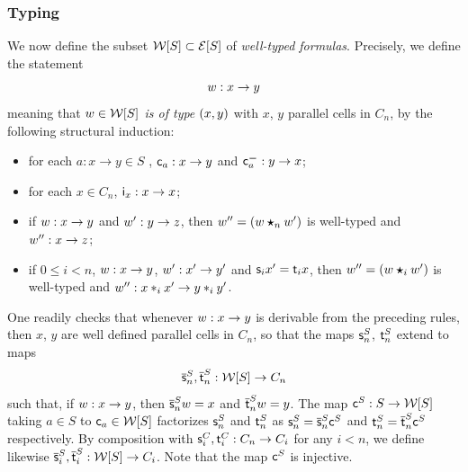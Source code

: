 \subsubsection{Typing}\label{ssubsec:types}
We now define the
subset  $\mathcal{W}[S]\subset\mathcal{E}[S]$ of {\em well-typed formulas}.
Precisely, we define the statement
\[w:x\to y\]
meaning that {\em $w\in\mathcal{W}[S]$ is of type $(x,y)$} with $x$, $y$ parallel
cells in $C_n$, by the following structural induction:
\begin{itemize}
\item for each $a:x\to y\in S$ ,
  $\mathsf{c}_{a}:x\to y$
  and $\mathsf{c}^{\boldsymbol{-}}_{a}:y\to x$;
\item for  each $x\in C_n$, $\mathsf{i}_{x}:x\to x$;
 \item if $w:x\to y$ and $w':y\to z$, then $w''=(w\bm{\star}_{n} w')$ is
   well-typed and $w'':x\to z$;
 \item if $0\leq i<n$, $w:x\to y$, $w':x'\to y'$ and $\mathsf{s}_{i}{x'}=\mathsf{t}_{i}{x}$, then $w''=(w\bm{\star}_{i} w')$ is well-typed and
   $w'':x\ast_{i} x'\to y\ast_{i} y'$. 
 \end{itemize}
 One readily checks that whenever $w:x\to y$ is derivable from the
 preceding rules, then $x$, $y$ are well defined parallel cells in
 $C_n$, so that the maps $\mathsf{s}_{n}^S$, $\mathsf{t}_{n}^S$ extend to maps
 \[\overline{\mathsf{s}}_{n}^S, \overline{\mathsf{t}}_{n}^S :\mathcal{W}[S]\to C_n\]
 such that, if $w:x\to y$,  then $\overline{\mathsf{s}}_{n}^S w=x$ and $\overline{\mathsf{t}}_{n}^S
 w=y$. The map $\mathsf{c}^{S}:S\to \mathcal{W}[S]$  taking
 $a\in S$ to $\mathsf{c}_{a}\in\mathcal{W}[S]$ factorizes $\mathsf{s}_{n}^S$ and $\mathsf{t}_{n}^S$
 as $\mathsf{s}_{n}^S=\overline{\mathsf{s}}_{n}^S \mathsf{c}^{S}$ and $\mathsf{t}_{n}^S=\overline{\mathsf{t}}_{n}^S\mathsf{c}^{S}$
 respectively. By composition with
 $\mathsf{s}_{i}^C,\mathsf{t}_{i}^C:C_n\to C_i$ for any $i<n$, we define likewise
 $\overline{\mathsf{s}}_{i}^S,\overline{\mathsf{t}}_{i}^S:\mathcal{W}[S]\to C_i$. Note that the map $\mathsf{c}^{S}$ is injective. 
 
